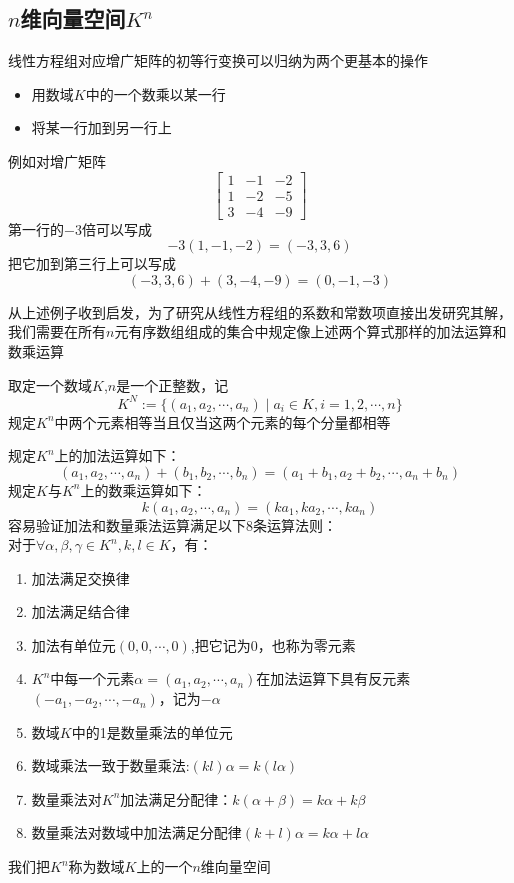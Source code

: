 \subsection{$n$维向量空间$K^n$}
线性方程组对应增广矩阵的初等行变换可以归纳为两个更基本的操作
\begin{itemize}
    \item 用数域$K$中的一个数乘以某一行
    \item 将某一行加到另一行上
\end{itemize}
例如对增广矩阵
\begin{equation*}
    \begin{bmatrix}
        1 & -1 & -2\\
        1 & -2 & -5\\
        3 & -4 & -9
    \end{bmatrix}
\end{equation*}
第一行的$-3$倍可以写成
\[ -3(1,-1,-2) = (-3,3,6) \]
把它加到第三行上可以写成
\[ (-3,3,6) + (3,-4,-9) = (0,-1,-3) \]

从上述例子收到启发，为了研究从线性方程组的系数和常数项直接出发研究其解，
我们需要在所有$n$元有序数组组成的集合中规定像上述两个算式那样的加法运算和数乘运算

取定一个数域$K$,$n$是一个正整数，记
\[ K^N := \{(a_1,a_2,\cdots, a_n) \mid a_i \in K, i = 1, 2, \cdots, n\}  \]
规定$K^n$中两个元素相等当且仅当这两个元素的每个分量都相等

规定$K^n$上的加法运算如下：
\[ (a_1,a_2,\cdots, a_n) + (b_1,b_2,\cdots, b_n)  = (a_1 + b_1, a_2 + b_2, \cdots, a_n + b_n)\]
规定$K$与$K^n$上的数乘运算如下：
\[ k(a_1,a_2,\cdots, a_n) = (ka_1, ka_2, \cdots, ka_n) \]
容易验证加法和数量乘法运算满足以下$8$条运算法则：\\
对于$\forall \alpha, \beta, \gamma \in K^n, k, l \in K$，有：
\begin{enumerate}
    \item 加法满足交换律
    \item 加法满足结合律
    \item 加法有单位元$(0,0, \cdots, 0)$,把它记为$0$，也称为零元素
    \item $K^n$中每一个元素$\alpha = (a_1,a_2,\cdots, a_n)$在加法运算下具有反元素$(-a_1, -a_2, \cdots, -a_n)$，记为$-\alpha$
    \item 数域$K$中的1是数量乘法的单位元
    \item 数域乘法一致于数量乘法:$(kl)\alpha = k(l\alpha)$
    \item 数量乘法对$K^n$加法满足分配律：$k(\alpha + \beta) = k\alpha + k\beta$
    \item 数量乘法对数域中加法满足分配律$(k+l)\alpha = k\alpha + l\alpha$
\end{enumerate}
我们把$K^n$称为数域$K$上的一个$n$维向量空间

